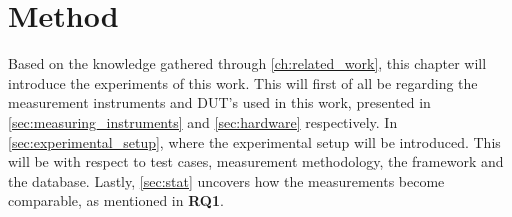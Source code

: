 \chapter{Method}\label{ch:method}

Based on the knowledge gathered through \cref*{ch:related_work}, this chapter will introduce the experiments of this work. This will first of all be regarding the measurement instruments and DUT's used in this work, presented in \cref*{sec:measuring_instruments} and \cref*{sec:hardware} respectively. In \cref*{sec:experimental_setup}, where the experimental setup will be introduced. This will be with respect to test cases, measurement methodology, the framework and the database. Lastly, \cref*{sec:stat} uncovers how the measurements become comparable, as mentioned in \textbf{RQ1}.







% 
% 


